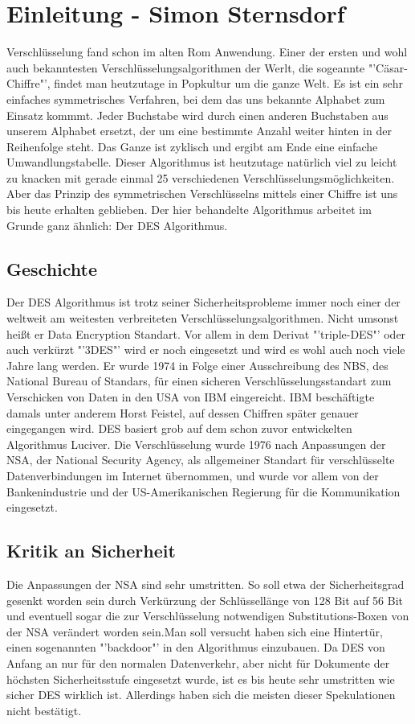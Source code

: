 \documentclass[
10pt, %
a4paper, %
oneside, %
headinclude,footinclude, %
BCOR5mm, %
]{scrartcl}
\begin{document}
\section{Einleitung - Simon Sternsdorf}  
Verschlüsselung fand schon im alten Rom Anwendung. Einer der ersten und wohl auch bekanntesten Verschlüsselungsalgorithmen der Werlt, die sogeannte "'Cäsar-Chiffre"', findet man heutzutage in Popkultur um die ganze Welt. Es ist ein sehr einfaches symmetrisches Verfahren, bei dem das uns bekannte Alphabet zum Einsatz kommmt. Jeder Buchstabe wird durch einen anderen Buchstaben aus unserem Alphabet ersetzt, der um eine bestimmte Anzahl weiter hinten in der Reihenfolge steht. Das Ganze ist zyklisch und ergibt am Ende eine einfache Umwandlungstabelle. \cite{5}  Dieser Algorithmus ist heutzutage natürlich viel zu leicht zu knacken mit gerade einmal 25 verschiedenen Verschlüsselungsmöglichkeiten. Aber das Prinzip des symmetrischen Verschlüsselns mittels einer Chiffre ist uns bis heute erhalten geblieben. Der hier behandelte Algorithmus arbeitet im Grunde ganz ähnlich: Der DES Algorithmus.

\subsection{Geschichte} 
Der DES Algorithmus ist trotz seiner Sicherheitsprobleme immer noch einer der weltweit am weitesten verbreiteten Verschlüsselungsalgorithmen. Nicht umsonst heißt er Data Encryption Standart. Vor allem in dem Derivat "'triple-DES"' oder auch verkürzt "'3DES"' wird er noch eingesetzt und wird es wohl auch noch viele Jahre lang werden. Er wurde 1974 in Folge einer Ausschreibung des NBS, des National Bureau of Standars,  für einen sicheren Verschlüsselungsstandart zum Verschicken von Daten in den USA von IBM eingereicht. IBM beschäftigte damals unter anderem Horst Feistel, auf dessen Chiffren später genauer eingegangen wird. DES basiert grob auf dem schon zuvor entwickelten Algorithmus Luciver. \cite{6}  Die Verschlüsselung wurde 1976 nach Anpassungen der NSA, der National Security Agency, als allgemeiner Standart für verschlüsselte Datenverbindungen im Internet übernommen, und wurde vor allem von der Bankenindustrie und der US-Amerikanischen Regierung für die Kommunikation eingesetzt. \cite{6}
 
\subsection{Kritik an Sicherheit}
Die Anpassungen der NSA sind sehr umstritten. So soll etwa der Sicherheitsgrad gesenkt worden sein durch Verkürzung der Schlüssellänge von 128 Bit auf 56 Bit und eventuell sogar die zur Verschlüsselung notwendigen Substitutions-Boxen von der NSA verändert worden sein.Man soll versucht haben sich eine Hintertür, einen sogenannten "'backdoor"' in den Algorithmus einzubauen. Da DES von Anfang an nur für den normalen Datenverkehr, aber nicht für Dokumente der höchsten Sicherheitsstufe eingesetzt wurde, ist es bis heute sehr umstritten wie sicher DES wirklich ist. \cite{7} Allerdings haben sich die meisten dieser Spekulationen nicht bestätigt. \cite[Seite 44]{2}
 
\end{document}
